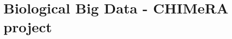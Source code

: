 \documentclass{standalone}
\begin{document}
\chapter[Big Data]{Biological Big Data - CHIMeRA project}\label{bigdata}

\end{document}
